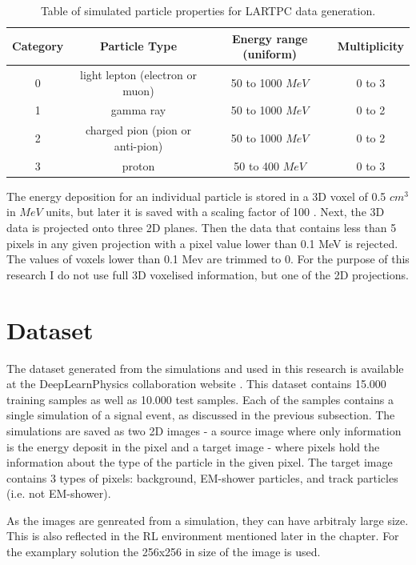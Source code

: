 \begin{table}[h]
\begin{center}
\begin{tabular}{ |c|c|c|c|}
\hline
Category & Particle Type & Energy range (uniform) & Multiplicity  \\
\hline
0 & light lepton (electron or muon) & 50 to 1000 $MeV$ & 0 to 3  \\
1 & gamma ray & 50 to 1000 $MeV$ & 0 to 2  \\
2 & charged pion (pion or anti-pion) & 50 to 1000 $MeV$ & 0 to 2  \\
3 & proton & 50 to 400 $MeV$ & 0 to 3  \\
\hline
\end{tabular}
\caption{\label{tab:sim_probs} Table of simulated particle properties for LARTPC data generation.}
\end{center}
\end{table}

The energy deposition for an individual particle is stored in a 3D voxel of 0.5 $cm^{3}$ in $MeV$ units, but later it is saved with a scaling factor of 100 \cite{dlp_tutorial}.
Next, the 3D data is projected onto three 2D planes.
Then the data that contains less than 5 pixels in any given projection with a pixel value lower than 0.1 MeV is rejected.
The values of voxels lower than 0.1 Mev are trimmed to 0.
For the purpose of this research I do not use full 3D voxelised information, but one of the 2D projections.


\section{Dataset}

The dataset generated from the simulations and used in this research is available at the DeepLearnPhysics collaboration website \cite{dlp_website}.
This dataset contains 15.000 training samples as well as 10.000 test samples.
Each of the samples contains a single simulation of a signal event, as discussed in the previous subsection.
The simulations are saved as two 2D images - a source image where only information is the energy deposit in the pixel and a target image - where pixels hold the information about the type of the particle in the given pixel.
The target image contains 3 types of pixels: background, EM-shower particles, and track particles (i.e. not EM-shower).

As the images are genreated from a simulation, they can have arbitraly large size.
This is also reflected in the RL environment mentioned later in the chapter.
For the examplary solution the 256x256 in size of the image is used.


